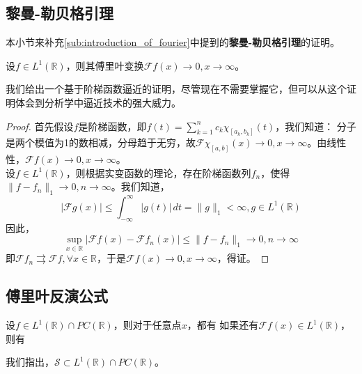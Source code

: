 \subsection{黎曼-勒贝格引理}\label{sub:riemman_lebesgue_lemma}
本小节来补充\ref{sub:introduction_of_fourier}中提到的\textbf{黎曼-勒贝格引理}的证明。
\begin{theorem}[黎曼-勒贝格引理]
    设$f\in L^1(\mathbb{R})$，则其傅里叶变换$\mathcal{F} f(x)\to 0,x\to\infty$。
\end{theorem}
我们给出一个基于阶梯函数逼近的证明，尽管现在不需要掌握它，但可以从这个证明体会到分析学中逼近技术的强大威力。
\begin{proof}
    首先假设$f$是阶梯函数，即$f(t)=\sum_{k=1}^{n}c_k \chi_{[a_k,b_k]}(t)$，我们知道：
    分子是两个模值为1的数相减，分母趋于无穷，故$\mathcal{F} \chi_{[a,b]}(x)\to 0,x\to\infty$。由线性性，$\mathcal{F} f(x)\to 0,x\to\infty$。\\
    设$f\in L^1(\mathbb{R})$，则根据实变函数的理论，存在阶梯函数列$f_n$，使得$\|f-f_n\|_1\to 0,n\to\infty$。我们知道，
    \[|\mathcal{F} g(x)|\leq \int_{-\infty}^{\infty}|g(t)|\,dt=\|g\|_1<\infty,g\in L^1(\mathbb{R})\]
    因此，
    \[\sup_{x\in\mathbb{R}}|\mathcal{F} f(x)-\mathcal{F} f_n(x)|\leq \|f-f_n\|_1\to 0,n\to\infty\]
    即$\mathcal{F} f_n\rightrightarrows\mathcal{F} f,\forall x\in\mathbb{R}$，于是$\mathcal{F} f(x)\to 0,x\to\infty$，得证。
\end{proof}

\subsection{傅里叶反演公式}\label{sub:fourier_inversion}
\begin{theorem}[傅里叶反演公式]
    设$f\in L^1(\mathbb{R})\cap PC(\mathbb{R})$，则对于任意点$x$，都有
    如果还有$\mathcal{F} f(x)\in L^1(\mathbb{R})$，则有
\end{theorem}
我们指出，$\mathcal{S} \subset L^1(\mathbb{R})\cap PC(\mathbb{R})$。

